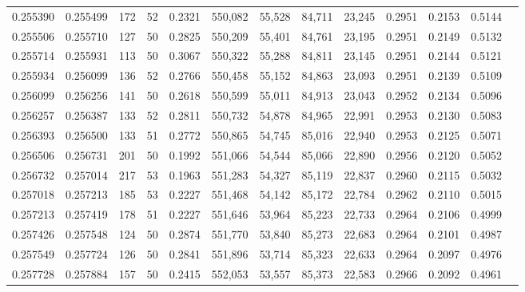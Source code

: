 \begin{tabular}{rrrrrrrrrrrrr}
0.255390 & 0.255499 &   172 &  52 &                                     0.2321 & 550,082 &  55,528 &  84,711 &  23,245 & 0.2951 & 0.2153 & 0.5144 \\
0.255506 & 0.255710 &   127 &  50 &                                     0.2825 & 550,209 &  55,401 &  84,761 &  23,195 & 0.2951 & 0.2149 & 0.5132 \\
0.255714 & 0.255931 &   113 &  50 &                                     0.3067 & 550,322 &  55,288 &  84,811 &  23,145 & 0.2951 & 0.2144 & 0.5121 \\
0.255934 & 0.256099 &   136 &  52 &                                     0.2766 & 550,458 &  55,152 &  84,863 &  23,093 & 0.2951 & 0.2139 & 0.5109 \\
0.256099 & 0.256256 &   141 &  50 &                                     0.2618 & 550,599 &  55,011 &  84,913 &  23,043 & 0.2952 & 0.2134 & 0.5096 \\
0.256257 & 0.256387 &   133 &  52 &                                     0.2811 & 550,732 &  54,878 &  84,965 &  22,991 & 0.2953 & 0.2130 & 0.5083 \\
0.256393 & 0.256500 &   133 &  51 &                                     0.2772 & 550,865 &  54,745 &  85,016 &  22,940 & 0.2953 & 0.2125 & 0.5071 \\
0.256506 & 0.256731 &   201 &  50 &                                     0.1992 & 551,066 &  54,544 &  85,066 &  22,890 & 0.2956 & 0.2120 & 0.5052 \\
0.256732 & 0.257014 &   217 &  53 &                                     0.1963 & 551,283 &  54,327 &  85,119 &  22,837 & 0.2960 & 0.2115 & 0.5032 \\
0.257018 & 0.257213 &   185 &  53 &                                     0.2227 & 551,468 &  54,142 &  85,172 &  22,784 & 0.2962 & 0.2110 & 0.5015 \\
0.257213 & 0.257419 &   178 &  51 &                                     0.2227 & 551,646 &  53,964 &  85,223 &  22,733 & 0.2964 & 0.2106 & 0.4999 \\
0.257426 & 0.257548 &   124 &  50 &                                     0.2874 & 551,770 &  53,840 &  85,273 &  22,683 & 0.2964 & 0.2101 & 0.4987 \\
0.257549 & 0.257724 &   126 &  50 &                                     0.2841 & 551,896 &  53,714 &  85,323 &  22,633 & 0.2964 & 0.2097 & 0.4976 \\
0.257728 & 0.257884 &   157 &  50 &                                     0.2415 & 552,053 &  53,557 &  85,373 &  22,583 & 0.2966 & 0.2092 & 0.4961 \\

\end{tabular}
